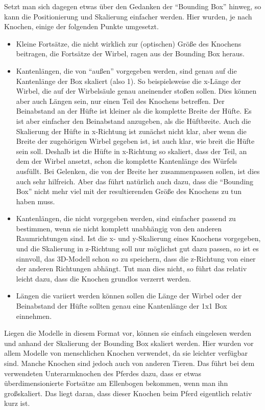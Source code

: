 Setzt man sich dagegen etwas über den Gedanken der "`Bounding Box"' hinweg, so kann die Positionierung und Skalierung einfacher werden. Hier wurden, je nach Knochen, einige der folgenden Punkte umgesetzt. 
\begin{itemize}
 \item Kleine Fortsätze, die nicht wirklich zur (optischen) Größe des Knochens beitragen, \zb die Fortsätze der Wirbel, ragen aus der Bounding Box heraus.
 
 \item Kantenlängen, die von "`außen"' vorgegeben werden, sind genau auf die Kantenlänge der Box skaliert (also 1). So beispielsweise die x-Länge der Wirbel, die auf der Wirbelsäule genau aneinender stoßen sollen. Dies können aber auch Längen sein, nur einen Teil des Knochens betreffen. Der Beinabstand an der Hüfte ist \zb kleiner als die komplette Breite der Hüfte. Es ist aber einfacher den Beinabstand anzugeben, als die Hüftbreite. Auch die Skalierung der Hüfte in x-Richtung ist zunächst nicht klar, aber wenn die Breite der zugehörigen Wirbel gegeben ist, ist auch klar, wie breit die Hüfte sein soll. Deshalb ist die Hüfte in x-Richtung so skaliert, dass der Teil, an dem der Wirbel ansetzt, schon die komplette Kantenlänge des Würfels ausfüllt. Bei Gelenken, die von der Breite her zusammenpassen sollen, ist dies auch sehr hilfreich. Aber das führt natürlich auch dazu, dass die "`Bounding Box"' nicht mehr viel mit der resultierenden Größe des Knochens zu tun haben muss.
 
 \item Kantenlängen, die nicht vorgegeben werden, sind einfacher passend zu bestimmen, wenn sie nicht komplett unabhängig von den anderen Raumrichtungen sind. Ist \zb die x- und y-Skalierung eines Knochens vorgegeben, und die Skalierung in z-Richtung soll nur möglichst gut dazu passen, so ist es sinnvoll, das 3D-Modell schon so zu speichern, dass die z-Richtung von einer der anderen Richtungen abhängt. Tut man dies nicht, so führt das relativ leicht dazu, dass die Knochen grundlos verzerrt werden.
 
 \item Längen die variiert werden können sollen \zb die Länge der Wirbel oder der Beinabstand der Hüfte sollten genau eine Kantenlänge der 1x1 Box einnehmen.
\end{itemize}

Liegen die Modelle in diesem Format vor, können sie einfach eingelesen werden und anhand der Skalierung der Bounding Box skaliert werden.
Hier wurden vor allem Modelle von menschlichen Knochen verwendet, da sie leichter verfügbar sind. Manche Knochen sind jedoch auch von anderen Tieren. Das führt \zb bei dem verwendeten Unterarmknochen des Pferdes dazu, dass er etwas überdimensionierte Fortsätze am Ellenbogen bekommen, wenn man ihn großskaliert. Das liegt daran, dass dieser Knochen beim Pferd eigentlich relativ kurz ist.

